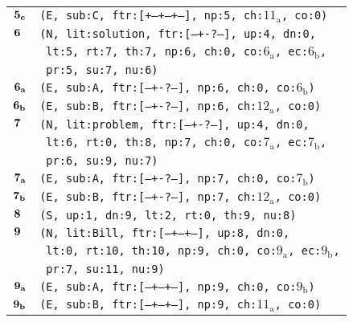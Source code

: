 \documentclass{article}
\begin{document}
\begin{minipage}{\textwidth}
{\begin{tabular}{|r|l|}
    ${\textbf{\textrm{5}}_{\textbf{\textrm{c}}}}$ & \texttt{\texttt{(E,~sub:C,~ftr:[+--+--+--],~np:5,~ch:${\textrm{11}_{\textrm{a}}}$,~co:0)}} \\
    ${\textbf{\textrm{6}}_{\phantom{z}}}$ & \texttt{\texttt{(N,~lit:solution,~ftr:[---+-?---],~up:4,~dn:0,}} \\
    & \texttt{\texttt{~lt:5,~rt:7,~th:7,~np:6,~ch:0,~co:${\textrm{6}_{\textrm{a}}}$,~ec:${\textrm{6}_{\textrm{b}}}$,}} \\
    & \texttt{\texttt{~pr:5,~su:7,~nu:6)}} \\
    ${\textbf{\textrm{6}}_{\textbf{\textrm{a}}}}$ & \texttt{\texttt{(E,~sub:A,~ftr:[---+-?---],~np:6,~ch:0,~co:${\textrm{6}_{\textrm{b}}}$)}} \\
    ${\textbf{\textrm{6}}_{\textbf{\textrm{b}}}}$ & \texttt{\texttt{(E,~sub:B,~ftr:[---+-?---],~np:6,~ch:${\textrm{12}_{\textrm{a}}}$,~co:0)}} \\
    ${\textbf{\textrm{7}}_{\phantom{z}}}$ & \texttt{\texttt{(N,~lit:problem,~ftr:[---+-?---],~up:4,~dn:0,}} \\
    & \texttt{\texttt{~lt:6,~rt:0,~th:8,~np:7,~ch:0,~co:${\textrm{7}_{\textrm{a}}}$,~ec:${\textrm{7}_{\textrm{b}}}$,}} \\
    & \texttt{\texttt{~pr:6,~su:9,~nu:7)}} \\
    ${\textbf{\textrm{7}}_{\textbf{\textrm{a}}}}$ & \texttt{\texttt{(E,~sub:A,~ftr:[---+-?---],~np:7,~ch:0,~co:${\textrm{7}_{\textrm{b}}}$)}} \\
    ${\textbf{\textrm{7}}_{\textbf{\textrm{b}}}}$ & \texttt{\texttt{(E,~sub:B,~ftr:[---+-?---],~np:7,~ch:${\textrm{12}_{\textrm{a}}}$,~co:0)}} \\
    ${\textbf{\textrm{8}}_{\phantom{z}}}$ & \texttt{\texttt{(S,~up:1,~dn:9,~lt:2,~rt:0,~th:9,~nu:8)}} \\
    ${\textbf{\textrm{9}}_{\phantom{z}}}$ & \texttt{\texttt{(N,~lit:Bill,~ftr:[---+--+--],~up:8,~dn:0,}} \\
    & \texttt{\texttt{~lt:0,~rt:10,~th:10,~np:9,~ch:0,~co:${\textrm{9}_{\textrm{a}}}$,~ec:${\textrm{9}_{\textrm{b}}}$,}} \\
    & \texttt{\texttt{~pr:7,~su:11,~nu:9)}} \\
    ${\textbf{\textrm{9}}_{\textbf{\textrm{a}}}}$ & \texttt{\texttt{(E,~sub:A,~ftr:[---+--+--],~np:9,~ch:0,~co:${\textrm{9}_{\textrm{b}}}$)}} \\
    ${\textbf{\textrm{9}}_{\textbf{\textrm{b}}}}$ & \texttt{\texttt{(E,~sub:B,~ftr:[---+--+--],~np:9,~ch:${\textrm{11}_{\textrm{a}}}$,~co:0)}} \\

\end{tabular}}
\end{minipage}
\end{document}
